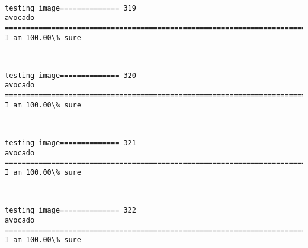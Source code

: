 \documentclass[11pt]{article}
\begin{document}
    \begin{center}
    \end{center}
    { \hspace*{\fill} \\}
    
    \begin{Verbatim}[commandchars=\\\{\}]
testing image============== 319
avocado
============================================================================
I am 100.00\% sure

    \end{Verbatim}

    \begin{center}
    \end{center}
    { \hspace*{\fill} \\}
    
    \begin{Verbatim}[commandchars=\\\{\}]
testing image============== 320
avocado
============================================================================
I am 100.00\% sure

    \end{Verbatim}

    \begin{center}
    \end{center}
    { \hspace*{\fill} \\}
    
    \begin{Verbatim}[commandchars=\\\{\}]
testing image============== 321
avocado
============================================================================
I am 100.00\% sure

    \end{Verbatim}

    \begin{center}
    \end{center}
    { \hspace*{\fill} \\}
    
    \begin{Verbatim}[commandchars=\\\{\}]
testing image============== 322
avocado
============================================================================
I am 100.00\% sure

    \end{Verbatim}
\end{document}
